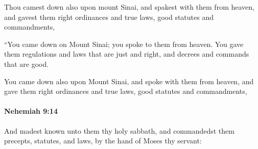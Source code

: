 			\begin{versebox}
					\item[BHS] 
					\item[LXX] 
					\item[ASV] Thou camest down also upon mount Sinai, and spakest with them from heaven, and gavest them right ordinances and true laws, good statutes and commandments,
					\item[NIV] “You came down on Mount Sinai; you spoke to them from heaven. You gave them regulations and laws that are just and right, and decrees and commands that are good.
					\item[NRSV] You came down also upon Mount Sinai, and spoke with them from heaven, and gave them right ordinances and true laws, good statutes and commandments,
			\end{versebox}

		\paragraph{Nehemiah 9:14} %
			\label{NEHEMIAH-9-14}

			And madest known unto them thy holy sabbath, and commandedst them precepts, statutes, and laws, by the hand of Moses thy servant:

